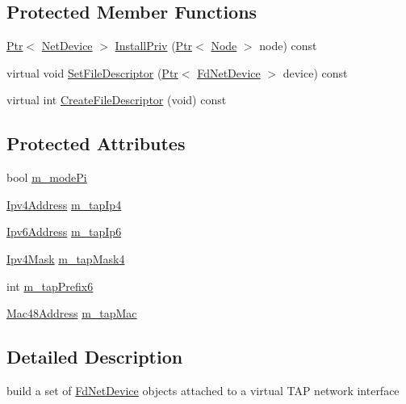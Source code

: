 \subsection*{Protected Member Functions}
\begin{DoxyCompactItemize}
\item 
\hyperlink{classns3_1_1Ptr}{Ptr}$<$ \hyperlink{classns3_1_1NetDevice}{Net\+Device} $>$ \hyperlink{classns3_1_1TapFdNetDeviceHelper_a5b95f44885b6b5a5285604be0c6fa413}{Install\+Priv} (\hyperlink{classns3_1_1Ptr}{Ptr}$<$ \hyperlink{classns3_1_1Node}{Node} $>$ node) const 
\item 
virtual void \hyperlink{classns3_1_1TapFdNetDeviceHelper_a8f1a78ce4fcf68db89d9acfccd6a3165}{Set\+File\+Descriptor} (\hyperlink{classns3_1_1Ptr}{Ptr}$<$ \hyperlink{classns3_1_1FdNetDevice}{Fd\+Net\+Device} $>$ device) const 
\item 
virtual int \hyperlink{classns3_1_1TapFdNetDeviceHelper_a096fe572156c6f315ca33f30d93e41c1}{Create\+File\+Descriptor} (void) const 
\end{DoxyCompactItemize}
\subsection*{Protected Attributes}
\begin{DoxyCompactItemize}
\item 
bool \hyperlink{classns3_1_1TapFdNetDeviceHelper_a4d9d824e6c5ac46ac9ebc34740cedd2b}{m\+\_\+mode\+Pi}
\item 
\hyperlink{classns3_1_1Ipv4Address}{Ipv4\+Address} \hyperlink{classns3_1_1TapFdNetDeviceHelper_a7f090cc7edb3f77def84e7a47614e3f4}{m\+\_\+tap\+Ip4}
\item 
\hyperlink{classns3_1_1Ipv6Address}{Ipv6\+Address} \hyperlink{classns3_1_1TapFdNetDeviceHelper_a6538c02cba836fd1b88779ea48d5d947}{m\+\_\+tap\+Ip6}
\item 
\hyperlink{classns3_1_1Ipv4Mask}{Ipv4\+Mask} \hyperlink{classns3_1_1TapFdNetDeviceHelper_a74e547cfb30f02bc0987a78c7c2465ee}{m\+\_\+tap\+Mask4}
\item 
int \hyperlink{classns3_1_1TapFdNetDeviceHelper_a9d2b4e1c9fcff1a2b254681f0e8f3719}{m\+\_\+tap\+Prefix6}
\item 
\hyperlink{classns3_1_1Mac48Address}{Mac48\+Address} \hyperlink{classns3_1_1TapFdNetDeviceHelper_a9a9956264595716d15dce3a036621437}{m\+\_\+tap\+Mac}
\end{DoxyCompactItemize}


\subsection{Detailed Description}
build a set of \hyperlink{classns3_1_1FdNetDevice}{Fd\+Net\+Device} objects attached to a virtual T\+AP network interface 

